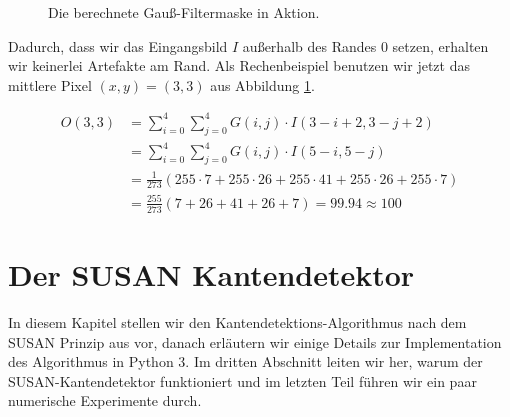 \documentclass[a4paper, 11pt]{report}
\theoremstyle{definition}
\begin{document}
\begin{center}
\begin{figure}[H]
\begin{minipage}{.475\textwidth}
				\end{minipage}
			\normalsize
			\caption{Die berechnete Gauß-Filtermaske in Aktion.}
			\label{fig:gaussian-example}
			\end{figure}
		\end{center}

		Dadurch, dass wir das Eingangsbild $I$ außerhalb des Randes 0 setzen, erhalten wir keinerlei Artefakte am Rand. Als Rechenbeispiel benutzen wir jetzt das mittlere Pixel $(x,y) = (3,3)$ aus Abbildung \ref{fig:gaussian-example}.

		\begin{align*}
			O(3,3) 	&= \sum_{i=0}^{4} \sum_{j=0}^{4} G(i,j) \cdot I(3-i+2, 3-j+2) 											\\
					&= \sum_{i=0}^{4} \sum_{j=0}^{4} G(i,j) \cdot I(5-i, 5-j) 												\\
					&= \frac{1}{273} \left( 255 \cdot 7 + 255 \cdot 26 + 255 \cdot 41 + 255 \cdot 26 + 255 \cdot 7 \right) 	\\
					&= \frac{255}{273} \left(7 + 26 + 41 + 26 + 7 \right) = 99.94 \approx 100
		\end{align*}



\chapter{Der SUSAN Kantendetektor}
	In diesem Kapitel stellen wir den Kantendetektions-Algorithmus nach dem SUSAN Prinzip aus \cite{SUSAN} vor, danach erläutern wir einige Details zur Implementation des Algorithmus in Python 3. Im dritten Abschnitt leiten wir her, warum der SUSAN-Kantendetektor funktioniert und im letzten Teil führen wir ein paar numerische Experimente durch.
\end{document}
